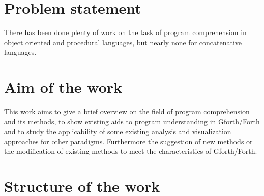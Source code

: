 \begin{comment}
\hl{mental model(LaToza et al., 2006) read: ..comment}
\@inproceedings\{Lieberman:1995:BGC:223904.223969,
author = \{Lieberman, Henry and Fry, Christopher\},
title = \{Bridging the Gulf Between Code and Behavior in Programming\},
booktitle = \{Proceedings of the SIGCHI Conference on Human Factors in Computing Systems\},
series = \{CHI '95\},
year = \{1995\},
isbn = \{0-201-84705-1\},
location = \{Denver, Colorado, USA\},
pages = \{480--486\},
numpages = \{7\},
url = \{http://dx.doi.org/10.1145/223904.223969\},
doi = \{10.1145/223904.223969\},
acmid = \{223969\},
publisher = \{ACM Press/Addison-Wesley Publishing Co.\},
address = \{New York, NY, USA\},
\}
\end{comment}


\section*{Problem statement}

There has been done plenty of work on the task of program comprehension in object oriented and procedural languages\cite{Cornelissen:2009:SSP:1638616.1639301}, but nearly none for concatenative languages. \begin{comment} The qualitative exploratory approach of this thesis does not encourage the formulation of specific hypothesis. Therefore the first question, is the applicability of existing methods and their visualization techniques. The second question to be answered, concerns new approaches, which may be exclusive to concatenative languages or Gforth/Forth.\end{comment}

\section*{Aim of the work}

This work aims to give a brief overview on the field of program comprehension and its methods, to show existing aids to program understanding in Gforth/Forth and to study the applicability of some existing analysis and visualization approaches for other paradigms. Furthermore the suggestion of new methods or the modification of existing methods to meet the characteristics of Gforth/Forth.

\section*{Structure of the work}

